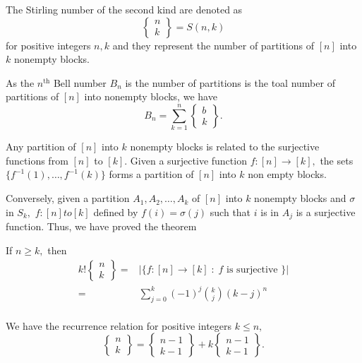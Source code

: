 \begin{definition}
	The Stirling number of the second kind are denoted as 
	$$ \begin{Bmatrix} n\\k \end{Bmatrix} = S(n,k)$$
	for positive integers $n,k$ and they represent the
	number of partitions of $[n]$ into $k$ nonempty blocks.
\end{definition}


\begin{remark}
	As the $n^\text{th}$ Bell number $B_n$ is the number of partitions is the toal number of partitions of $[n]$ into nonempty blocks, we have
	$$B_n = \sum_{k=1}^{n} \begin{Bmatrix} b\\k\end{Bmatrix}.$$ 
\end{remark}



Any partition of $[n]$ into $k$ nonempty blocks is related to the
surjective functions from $[n]$ to $[k].$ Given a surjective function
$f \colon [n] \to [k],$ the sets $\{ f^{-1}(1), \dotsc, f^{-1}(k)\}$
forms a partition of $[n]$ into $k$ non empty blocks.

Conversely, given a partition $A_1, A_2, \dotsc, A_k$ of $[n]$ into $k$ nonempty blocks and $\sigma$ in $S_k,$ $f \colon [n] to [k]$ defined by
$f(i) = \sigma(j)$ such that $i$ is in $A_{j}$ is a surjective function.
Thus, we have proved the theorem
\begin{theorem}
	If $n \geq k,$ then 
	\begin{align*}
		k! \begin{Bmatrix} n\\k\end{Bmatrix}
		={}& \lvert \{ f\colon [n] \to [k] \; : \;
		f \text{ is surjective } \} \rvert \\
		={}& \sum_{j=0}^{k} (-1)^j \binom{k}{j} (k-j)^n\\
	\end{align*}
\end{theorem}


\begin{remark}
	We have the recurrence relation for positive integers $k \leq n,$
	$$ \begin{Bmatrix} n\\k\end{Bmatrix} = 
	\begin{Bmatrix}n-1\\k-1 \end{Bmatrix} + 
	k \begin{Bmatrix}n-1\\k-1 \end{Bmatrix}. $$
\end{remark}


